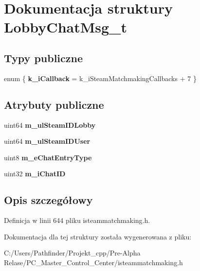 \hypertarget{struct_lobby_chat_msg__t}{}\section{Dokumentacja struktury Lobby\+Chat\+Msg\+\_\+t}
\label{struct_lobby_chat_msg__t}
\subsection*{Typy publiczne}
\begin{DoxyCompactItemize}
\item 
\mbox{\label{struct_lobby_chat_msg__t_a87beb0f5e83ac702f820f70390ec3d4e}} 
enum \{ {\bfseries k\+\_\+i\+Callback} = k\+\_\+i\+Steam\+Matchmaking\+Callbacks + 7
 \}
\end{DoxyCompactItemize}
\subsection*{Atrybuty publiczne}
\begin{DoxyCompactItemize}
\item 
\mbox{\label{struct_lobby_chat_msg__t_a219040c030b77a37daed98d7f4e19258}} 
uint64 {\bfseries m\+\_\+ul\+Steam\+I\+D\+Lobby}
\item 
\mbox{\label{struct_lobby_chat_msg__t_a5bf773ba60aac45ce12c8b2d4a8d6c4e}} 
uint64 {\bfseries m\+\_\+ul\+Steam\+I\+D\+User}
\item 
\mbox{\label{struct_lobby_chat_msg__t_a17524709380caa83f5986bb84512db56}} 
uint8 {\bfseries m\+\_\+e\+Chat\+Entry\+Type}
\item 
\mbox{\label{struct_lobby_chat_msg__t_affa5bd26aec09e6d1ad8a47845680a5d}} 
uint32 {\bfseries m\+\_\+i\+Chat\+ID}
\end{DoxyCompactItemize}


\subsection{Opis szczegółowy}


Definicja w linii 644 pliku isteammatchmaking.\+h.



Dokumentacja dla tej struktury została wygenerowana z pliku\+:\begin{DoxyCompactItemize}
\item 
C\+:/\+Users/\+Pathfinder/\+Projekt\+\_\+cpp/\+Pre-\/\+Alpha Relase/\+P\+C\+\_\+\+Master\+\_\+\+Control\+\_\+\+Center/isteammatchmaking.\+h\end{DoxyCompactItemize}
